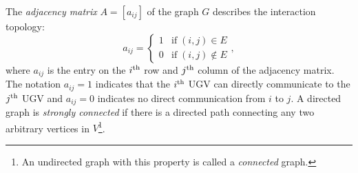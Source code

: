 	The \textit{adjacency matrix} $A=\left[ a_{ij}\right] $ of the graph $G$ describes the interaction topology:
	\small\begin{equation*}
		a_{ij}=\begin{cases}
			1& \text{if}\;\left(i,j\right)\in E\\
			0& \text{if}\;\left(i,j\right)\notin E
		\end{cases},
	\end{equation*} \normalsize
	where $a_{ij}$ is the entry on the $i^\text{th}$ row and $j^\text{th}$ column of the adjacency matrix. 
	The notation $a_{ij}=1$ indicates that the $i^\text{th}$ UGV can directly communicate to the $j^\text{th}$ UGV and $a_{ij}=0$ indicates no direct communication from $i$ to $j$.
	 A directed graph is \textit{strongly connected} if there is a directed path connecting any two arbitrary vertices in $V$\footnote{An undirected graph with this property is called a \textit{connected} graph.}.
	
